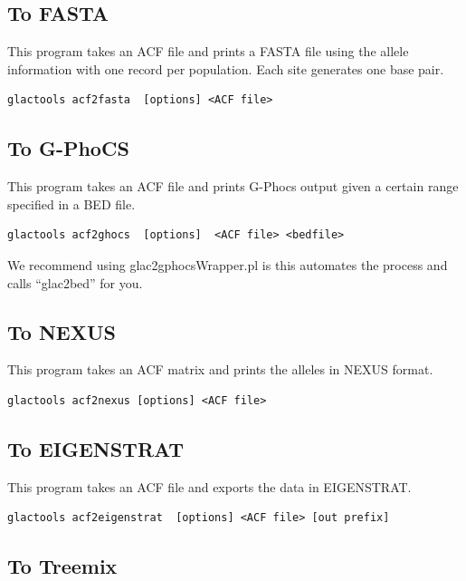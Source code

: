 \documentclass[a4paper]{article}
\begin{document}
\subsection{To FASTA}

\noindent This program takes an ACF file and prints a FASTA file using the allele information with one record per population. Each site generates one base pair.

\begin{lstlisting}
glactools acf2fasta  [options] <ACF file>
\end{lstlisting}


\subsection{To G-PhoCS}

\noindent This program takes an ACF file and prints G-Phocs output given a certain range specified in a BED file.

\begin{lstlisting}
glactools acf2ghocs  [options]  <ACF file> <bedfile>
\end{lstlisting}

We recommend using glac2gphocsWrapper.pl is this automates the process and calls ``glac2bed'' for you.

\subsection{To NEXUS}

\noindent This program takes an ACF matrix and prints the alleles in NEXUS format.

\begin{lstlisting}
glactools acf2nexus [options] <ACF file> 
\end{lstlisting}

\subsection{To EIGENSTRAT}
\noindent This program takes an ACF file and exports the data in EIGENSTRAT.
\tiny
\begin{lstlisting}
glactools acf2eigenstrat  [options] <ACF file> [out prefix]
\end{lstlisting}
\normalsize

\subsection{To Treemix}
\end{document}

